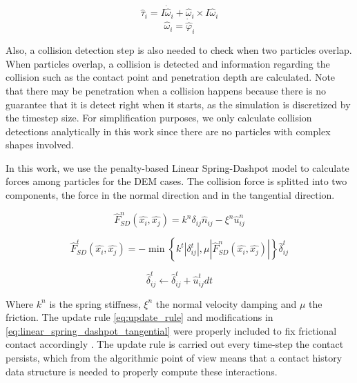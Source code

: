 \documentclass[preprint,12pt]{elsarticle}
\begin{document}
\begin{equation}
    \hat{\tau}{_i} = I \dot{\hat \omega}_i + {\hat \omega}_i \times I {\hat \omega}_i \label{eq:newton_torque}
\end{equation}
\begin{equation}
    \hat{\omega}{_i} = \dot{\hat{\varphi}}_i \label{eq:newton_angular_velocity}
\end{equation}

Also, a collision detection step is also needed to check when two particles overlap.
When particles overlap, a collision is detected and information regarding the collision such as the contact point and penetration depth are calculated.
Note that there may be penetration when a collision happens because there is no guarantee that it is detect right when it starts, as the simulation is discretized by the timestep size.
For simplification purposes, we only calculate collision detections analytically in this work since there are no particles with complex shapes involved.

In this work, we use the penalty-based Linear Spring-Dashpot model to calculate forces among particles for the DEM cases.
The collision force is splitted into two components, the force in the normal direction and in the tangential direction.

\begin{equation}
    \hat{F}_{SD}^{n}(\hat{x_i}, \hat{x_j}) = k^{n}\delta_{ij}\hat{n}_{ij} - \xi^{n}\hat{u}_{ij}^{n}
    \label{eq:linear_spring_dashpot_normal}
\end{equation}

\begin{equation}
    \hat{F}_{SD}^{t}(\hat{x_i}, \hat{x_j}) = -\min \left\{ k^{t}\left| \delta^{t}_{ij} \right|,\mu\left|\hat{F}_{SD}^{n}(\hat{x_i}, \hat{x_j}) \right| \right\} \hat{\delta}^{t}_{ij}
    \label{eq:linear_spring_dashpot_tangential}
\end{equation}

\begin{equation}
    \hat{\delta}^{t}_{ij} \gets \hat{\delta}^{t}_{ij} + \hat{u}_{ij}^{t}dt
    \label{eq:update_rule}
\end{equation}

Where $k^{n}$ is the spring stiffness, $\xi^{n}$ the normal velocity damping and $\mu$ the friction.
The update rule \autoref{eq:update_rule} and modifications in \autoref{eq:linear_spring_dashpot_tangential} were properly included to fix frictional contact accordingly \cite{dem1,dem2}.
The update rule is carried out every time-step the contact persists, which from the algorithmic point of view means that a contact history data structure is needed to properly compute these interactions.
\end{document}
